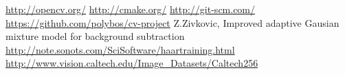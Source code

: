 \documentclass[conference]{IEEEtran}
\begin{document}


%
%
%
\renewcommand*{\refname}{Quellen}
\begin{thebibliography}{1}
		\url{http://opencv.org/}
		\url{http://cmake.org/}
		\url{http://git-scm.com/}
		\url{https://github.com/polybos/cv-project}
		Z.Zivkovic, Improved adaptive Gausian mixture model for background subtraction
		\url{http://note.sonots.com/SciSoftware/haartraining.html}
		\url{http://www.vision.caltech.edu/Image_Datasets/Caltech256}
\end{thebibliography}




\end{document}
